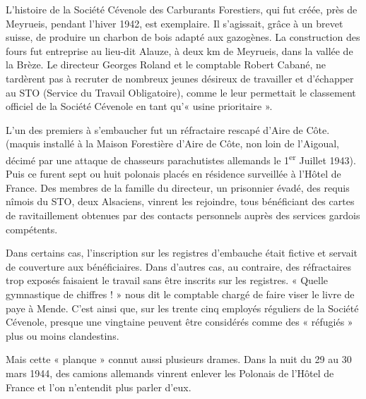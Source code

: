 


\vspace{1.2cm}

L’histoire de la Société Cévenole des Carburants Forestiers, qui fut créée, près de
Meyrueis, pendant l’hiver 1942, est exemplaire. Il s’agissait, grâce à un brevet suisse,
de produire un charbon de bois adapté aux gazogènes. La construction des fours fut
entreprise au lieu-dit Alauze, à deux km de Meyrueis, dans la vallée de la Brèze. Le
directeur Georges Roland et le comptable Robert Cabané, ne tardèrent pas à recruter
de nombreux jeunes désireux de travailler et d’échapper au STO (Service du Travail
Obligatoire), comme le leur permettait le classement officiel de la Société Cévenole en
tant qu’« usine prioritaire ».

\vspace{0.45cm}

L’un des premiers à s’embaucher fut un réfractaire rescapé d’Aire de Côte. (maquis
installé à la Maison Forestière d’Aire de Côte, non loin de l’Aigoual, décimé par une
attaque de chasseurs parachutistes allemands le 1\textsuperscript{er} Juillet 1943).
Puis ce furent sept ou huit polonais placés en résidence surveillée à l’Hôtel de France.
Des membres de la famille du directeur, un prisonnier évadé, des requis nîmois du STO,
deux Alsaciens, vinrent les rejoindre, tous bénéficiant des cartes de ravitaillement
obtenues par des contacts personnels auprès des services gardois compétents.

\vspace{0.45cm}

Dans certains cas, l’inscription sur les registres d’embauche était fictive et servait de
couverture aux bénéficiaires. Dans d’autres cas, au contraire, des réfractaires trop
exposés faisaient le travail sans être inscrits sur les registres. « Quelle gymnastique
de chiffres ! » nous dit le comptable chargé de faire viser le livre de paye à Mende.
C’est ainsi que, sur les trente cinq employés réguliers de la Société Cévenole,
presque une vingtaine peuvent être considérés comme des « réfugiés » plus ou moins
clandestins.

\vspace{0.45cm}

Mais cette « planque » connut aussi plusieurs drames. Dans la nuit du 29 au 30 mars
1944, des camions allemands vinrent enlever les Polonais de l’Hôtel de France et
l’on n’entendit plus parler d’eux.

